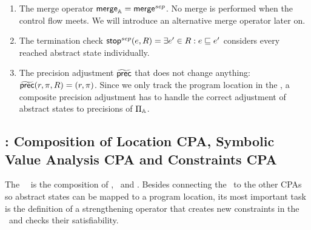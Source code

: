 \begin{enumerate}[leftmargin=*,label=\arabic*.]
\item The merge operator $\operatorname{\operatorname{\mathsf{merge}}}_{\mathbb{A}} = \operatorname{\operatorname{\mathsf{merge}}}^{sep}$. No merge is performed when the control flow meets. We will introduce an alternative merge operator later on.
\item The termination check $\operatorname{\operatorname{\mathsf{stop}}}^{sep}(e, R) = \exists e' \in R: e \sqsubseteq e'$ considers every reached abstract state individually.

\item
The precision adjustment $\operatorname{\widetilde{\operatorname{\operatorname{\mathsf{prec}}}}}$ that does not change anything: $\operatorname{\widetilde{\operatorname{\operatorname{\mathsf{prec}}}}}(r, \pi, R) = (r, \pi)$.
Since we only track the program location in the \locationCPA, a composite precision adjustment has to handle the correct adjustment of abstract states to precisions of $\Pi_{\mathbb{A}}$.

\end{enumerate}


\subsection{\SymbolicExecutionCPA : Composition of Location CPA, Symbolic Value Analysis CPA and Constraints CPA}
The \symbolicExecutionCPA\ \cite{Lemberger2015}\ is the composition of \locationCPA, \symbolicValueAnalysisCPA\ and \constraintsCPA.
Besides connecting the \locationCPA\ to the other CPAs so abstract states can be mapped to a program location, its most important task is the definition of a strengthening operator that creates new constraints in the \constraintsCPA\ and checks their satisfiability.

